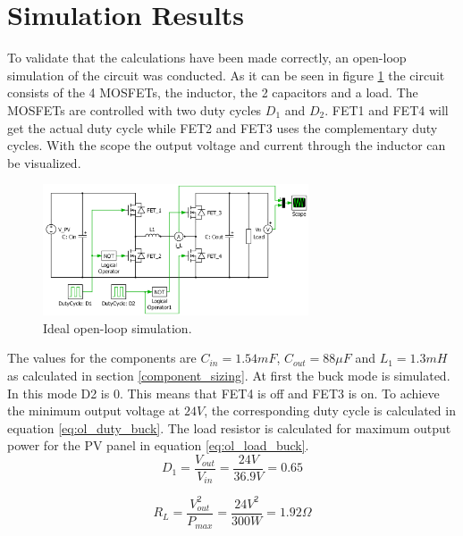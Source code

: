\section{Simulation Results} \label{opsimresult}

To validate that the calculations have been made correctly, an open-loop simulation of the circuit was conducted. As it can be seen in figure \ref{fig:openloop_schematic} the circuit consists of the 4 MOSFETs, the inductor, the 2 capacitors and a load. The MOSFETs are controlled with two duty cycles $D_1$ and $D_2$. FET1 and FET4 will get the actual duty cycle while FET2 and FET3 uses the complementary duty cycles. With the scope the output voltage and current through the inductor can be visualized.

\begin{figure}[H]
	\begin{center}
		\includegraphics[width=0.7\textwidth]{../Pictures/P1/Open_loop_simulation/open_loop_schematic}
		\caption{Ideal open-loop simulation.}
		\label{fig:openloop_schematic}
	\end{center}
\end{figure}

The values for the components are $C_{in}=1.54mF$, $C_{out}=88 \mu F$ and $L_{1}=1.3mH$ as calculated in section \ref{component_sizing}. At first the buck mode is simulated. In this mode D2 is 0. This means that FET4 is off and FET3 is on. To achieve the minimum output voltage at $24V$, the corresponding duty cycle is calculated in equation \ref{eq:ol_duty_buck}. The load resistor is calculated for maximum output power for the PV panel in equation \ref{eq:ol_load_buck}.
\begin{equation} \label{eq:ol_duty_buck}
	D_1= \frac{V_{out}}{V_{in}} = \frac{24V}{36.9V} = 0.65
\end{equation}

\begin{equation} \label{eq:ol_load_buck}
	R_L = \frac{V_{out}^2}{P_{max}} = \frac{24V^2}{300W} = 1.92 \Omega
\end{equation}


